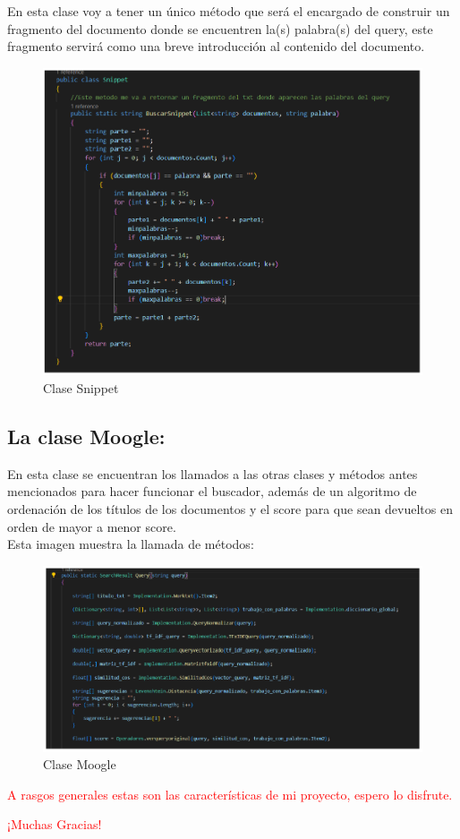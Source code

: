 \documentclass[a4paper,12pt]{article}
\begin{document}
    En esta clase voy a tener un único método que será el encargado de construir un fragmento del documento donde se encuentren la(s) palabra(s) del query, este fragmento servirá como una breve introducción al contenido del documento.
    \begin{figure}[h]
    	\centering
    	\includegraphics[width=13cm]{snippet.png}
    	\caption{Clase Snippet}
    \end{figure}
    
    \subsection{La clase Moogle:}
    
    En esta clase se encuentran los llamados a las otras clases y métodos antes mencionados para hacer funcionar el buscador, además de un algoritmo de ordenación de los títulos de los documentos y el score para que sean devueltos en orden de mayor a menor score.\\
    
    Esta imagen muestra la llamada de métodos:\\
    \begin{figure}[h]
    	\centering
    	\includegraphics[width=14cm]{classmoogle.png}
    	\caption{Clase Moogle}
    \end{figure}



    \Large\textcolor{red}{A rasgos generales estas son las características de mi proyecto, espero lo disfrute.}
    \begin{center}
    \Huge\textcolor{red}{¡Muchas Gracias!}
    \end{center}
    
\end{document}
